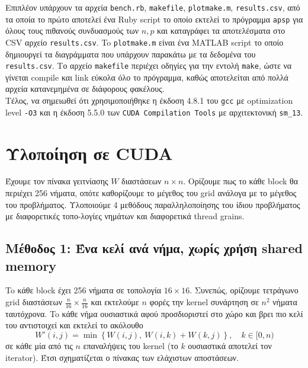 \documentclass[11pt,a4paper,titlepage]{article}
\begin{document}
	Επιπλέον υπάρχουν τα αρχεία \verb|bench.rb|, \verb|makefile|, \verb|plotmake.m|, \verb|results.csv|, από τα οποία το πρώτο αποτελεί ένα Ruby script το οποίο εκτελεί το πρόγραμμα \verb|apsp| για όλους τους πιθανούς συνδυασμούς των $n, p$ και καταγράφει τα αποτελέσματα στο CSV αρχείο \verb|results.csv|. To \verb|plotmake.m| είναι ένα MATLAB script το οποίο δημιουργεί τα διαγράμματα που υπάρχουν παρακάτω με τα δεδομένα του \verb|results.csv|. Το αρχείο \verb|makefile| περιέχει οδηγίες για την εντολή \verb|make|, ώστε να γίνεται compile και link εύκολα όλο το πρόγραμμα, καθώς αποτελείται από πολλά αρχεία κατανεμημένα σε διάφορους φακέλους.\\
	
	Τέλος, να σημειωθεί ότι χρησιμοποιήθηκε η έκδοση 4.8.1 του \verb|gcc| με optimization level \verb|-O3| και η έκδοση 5.5.0 των \verb|CUDA Compilation Tools| με αρχιτεκτονική \verb|sm_13|. 
	
\section{Υλοποίηση σε CUDA}
	Έχουμε τον πίνακα γειτνίασης $W$ διαστάσεων $n\times n$. Ορίζουμε πως το κάθε block θα περιέχει 256 νήματα, οπότε  καθορίζουμε το μέγεθος του grid ανάλογα με το μέγεθος του προβλήματος. Υλοποιούμε 4 μεθόδους παραλληλοποίησης του ίδιου προβλήματος με διαφορετικές τοπο-λογίες νημάτων και διαφορετικά thread grains. 
	
\subsection{Μέθοδος 1: Ένα κελί ανά νήμα, χωρίς χρήση shared memory}
	To κάθε block έχει 256 νήματα σε τοπολογία $16 \times 16$. Συνεπώς, ορίζουμε τετράγωνο grid διαστάσεων $\tfrac{n}{16}\times\tfrac{n}{16}$ και εκτελούμε $n$ φορές την kernel συνάρτηση σε $n^2$ νήματα ταυτόχρονα. To κάθε νήμα ουσιαστικά αφού προσδιοριστεί στο χώρο και βρει πιο κελί του αντιστοιχεί και εκτελεί το ακόλουθο
	$$
		W'(i, j) = \min\left\{W(i, j),\ W(i,k) + W(k,j)\right\},\quad k \in [0, n)
	$$
	σε κάθε μία από τις $n$ επαναλήψεις του kernel (το $k$ ουσιαστικά αποτελεί τον iterator). Έτσι σχηματίζεται ο πίνακας των ελάχιστων αποστάσεων.
\end{document}
